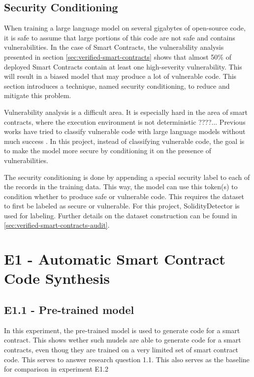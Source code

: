 %


\subsection{Security Conditioning}
\label{sec:security-conditioning}
When training a large language model on several gigabytes of open-source code, it is safe to assume that large portions of this code are not safe and contains vulnerabilities. In the case of Smart Contracts, the vulnerability analysis presented in section \ref{sec:verified-smart-contracts} shows that almost 50\% of deployed Smart Contracts contain at least one high-severity vulnerability. This will result in a biased model that may produce a lot of vulnerable code. This section introduces a technique, named security conditioning, to reduce and mitigate this problem.

Vulnerability analysis is a difficult area. It is especially hard in the area of smart contracts, where the execution environment is not deterministic ????... Previous works have tried to classify vulnerable code with large language models without much success . In this project, instead of classifying vulnerable code, the goal is to make the model more secure by conditioning it on the presence of vulnerabilities.

The security conditioning is done by appending a special security label to each of the records in the training data. This way, the model can use this token(s) to condition whether to produce safe or vulnerable code. This requires the dataset to first be labeled as secure or vulnerable. For this project, SolidityDetector is used for labeling. Further details on the dataset construction can be found in \cref{sec:verified-smart-contracts-audit}.


\section{E1 - Automatic Smart Contract Code Synthesis}
\label{sec:e1-automatic-smart-contract-code-synthesis}

\subsection{E1.1 - Pre-trained model}
\label{sec:e2.1-pre-trained-model}
In this experiment, the pre-trained model is used to generate code for a smart contract. This shows wether such mudels are able to generate code for a smart contracts, even thoug they are trained on a very limited set of smart contract code. This serves to answer research  question 1.1. This also serves as the baseline for comparison in experiment E1.2

